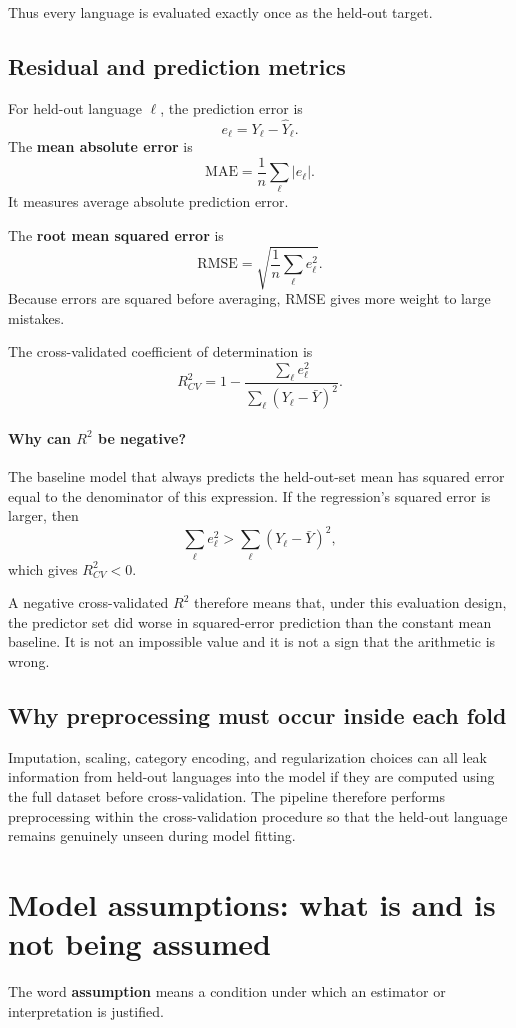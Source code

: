\documentclass[11pt]{article}
\begin{document}
Thus every language is evaluated exactly once as the held-out target.

\subsection{Residual and prediction metrics}
For held-out language $\ell$, the prediction error is
\[
e_\ell=Y_\ell-\hat Y_\ell.
\]
The \textbf{mean absolute error} is
\[
\boxed{\mathrm{MAE}=\frac1n\sum_\ell|e_\ell|.}
\]
It measures average absolute prediction error.

The \textbf{root mean squared error} is
\[
\boxed{\mathrm{RMSE}=\sqrt{\frac1n\sum_\ell e_\ell^2}.}
\]
Because errors are squared before averaging, RMSE gives more weight to large mistakes.

The cross-validated coefficient of determination is
\[
\boxed{
R^2_{CV}=1-\frac{\sum_\ell e_\ell^2}
{\sum_\ell(Y_\ell-\bar Y)^2}.
}
\]

\paragraph{Why can $R^2$ be negative?}
The baseline model that always predicts the held-out-set mean has squared error equal to the denominator of this expression. If the regression's squared error is larger, then
\[
\sum_\ell e_\ell^2>
\sum_\ell(Y_\ell-\bar Y)^2,
\]
which gives $R^2_{CV}<0$.

A negative cross-validated $R^2$ therefore means that, under this evaluation design, the predictor set did worse in squared-error prediction than the constant mean baseline. It is not an impossible value and it is not a sign that the arithmetic is wrong.

\subsection{Why preprocessing must occur inside each fold}
Imputation, scaling, category encoding, and regularization choices can all leak information from held-out languages into the model if they are computed using the full dataset before cross-validation. The pipeline therefore performs preprocessing within the cross-validation procedure so that the held-out language remains genuinely unseen during model fitting.

\newpage
\section{Model assumptions: what is and is not being assumed}
The word \textbf{assumption} means a condition under which an estimator or interpretation is justified.
\end{document}
